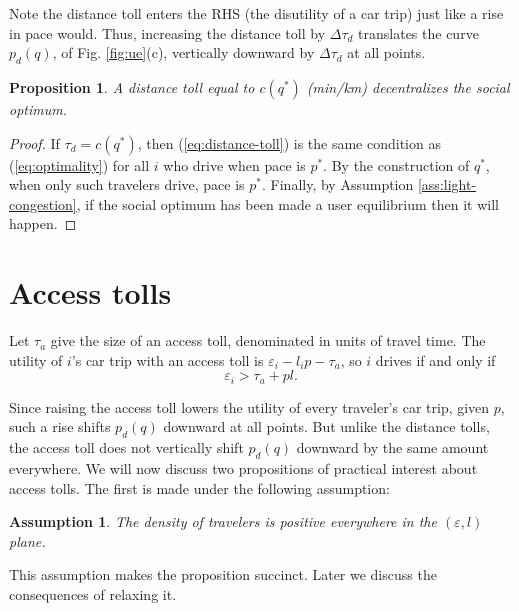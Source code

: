 \documentclass[preprint,authoryear]{elsarticle}
\newcommand{\taud}{\tau_d}
\newcommand{\taua}{\tau_a}
\newcommand{\ve}{\varepsilon}
\newtheorem{proposition}{Proposition}
\newtheorem{assumption}{Assumption}
\begin{document}
Note the distance toll enters the RHS (the disutility of a car trip) just like a rise in pace would. Thus, increasing the distance toll by $\Delta \taud$ translates the curve $p_d(q)$, of Fig. \ref{fig:ue}(c), vertically downward by $\Delta \taud$ at all points.

\begin{proposition}
A distance toll equal to $c(q^*)$ (min/km) decentralizes the social optimum.
\end{proposition}
\begin{proof}
If $\taud=c(q^*)$, then (\ref{eq:distance-toll}) is the same condition as (\ref{eq:optimality}) for all $i$ who drive when pace is $p^*$. By the construction of $q^*$, when only such travelers drive, pace is $p^*$. Finally, by Assumption \ref{ass:light-congestion}, if the social optimum has been made a user equilibrium then it will happen.
\end{proof}

\section{Access tolls}
\label{sec:access_tolls}

Let $\taua$ give the size of an access toll, denominated in units of travel time. The utility of $i$'s car trip with an access toll is $\ve_i - l_ip - \taua$, so $i$ drives if and only if
\begin{equation}
	\ve_i > \taua + pl.
\end{equation}

Since raising the access toll lowers the utility of every traveler's car trip, given $p$, such a rise shifts $p_d(q)$ downward at all points. But unlike the distance tolls, the access toll does not vertically shift $p_d(q)$ downward by the same amount everywhere. We will now discuss two propositions of practical interest about access tolls. The first is made under the following assumption:

\begin{assumption}\label{ass:density}
	The density of travelers is positive everywhere in the $(\ve,l)$ plane.
\end{assumption}

\noindent This assumption makes the proposition succinct. Later we discuss the consequences of relaxing it.
\end{document}
